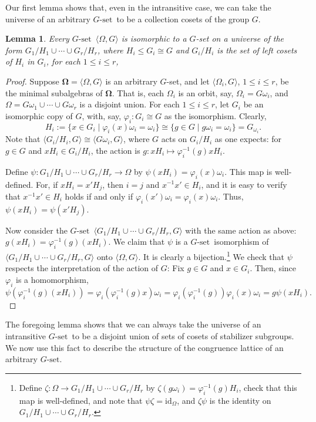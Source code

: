 \documentclass[cm,dissertation]{uhthesis}
\theoremstyle{plain}
\newtheorem{lemma}[theorem]{Lemma}
\theoremstyle{definition}
\newcounter{claim}
\theoremstyle{remark}
\numberwithin{theorem}{section}
\numberwithin{claim}{chapter}
\numberwithin{equation}{section}
\numberwithin{conjecture}{chapter}
\newcommand{\<}{\ensuremath{\langle}}
\renewcommand{\>}{\ensuremath{\rangle}}
\renewcommand{\leq}{\ensuremath{\leqslant}}
\newcommand{\0}{\ensuremath{\mathbf{0}}}
\newcommand{\1}{\ensuremath{\mathbf{1}}}
\newcommand{\2}{\ensuremath{\mathbf{2}}}
\newcommand{\3}{\ensuremath{\mathbf{3}}}
\newcommand{\4}{\ensuremath{\mathbf{4}}}
\newcommand{\5}{\ensuremath{\mathbf{5}}}
\newcommand{\Gset}{\ensuremath{G\text{-set}}}
\newcommand{\alg}[1]{\mathbf{#1}}
\newcommand{\la}{\langle}	     %
\newcommand{\ra}{\rangle}	     %
\newcommand{\id}{\ensuremath{\mathrm{id}}}
\renewcommand{\phi}{\ensuremath{\varphi}}
\begin{document}
Our first lemma shows that, even in the intransitive case, we can take the
universe of an arbitrary \Gset\ to be a collection cosets of the group $G$.
\begin{lemma}
\label{lem:intransitive-gsets}
Every \Gset\ $\la \Omega,G\ra$ is isomorphic to a $G$-set on a universe of
the form $G_1/H_1 \cup \cdots \cup G_r/H_r$, where
$H_i \leq G_i\cong G$ and $G_i/H_i$ is the set of left cosets of $H_i$ in $G_i$,
for each $1\leq i\leq r$, 
\end{lemma}
\begin{proof}
Suppose $\alg \Omega = \la \Omega, G\ra$ is an arbitrary $G$-set, and let $\<\Omega_i, G\>$, 
$1 \leq i \leq r$,
be the minimal subalgebras of $\alg \Omega$.  That is, each $\Omega_i$ is an
orbit, say, $\Omega_i = G\omega_i$,  
and $\Omega = G\omega_1 \cup \cdots \cup G\omega_r$ is a disjoint union.
For each $1\leq i \leq r$, let $G_i$ be an isomorphic copy of $G$, with, say,
$\phi_i: G_i\cong G$ as the isomorphism. Clearly,
\[
H_i := \{x \in G_i \mid  \phi_i(x)\omega_i = \omega_i\} \cong \{g\in G \mid
g \omega_i = \omega_i\} = G_{\omega_i}.
\]
Note that $\<G_i/H_i, G\> \cong \<G \omega_i, G\>$, where $G$ acts on $G_i/H_i$ as one
expects: for $g\in G$ and $xH_i\in G_i/H_i$, the action is
$g: xH_i \mapsto \phi_i^{-1}(g)x H_i$. 

Define 
$\psi: G_1/H_1 \cup \cdots \cup G_r/H_r \rightarrow \Omega$
by $\psi(xH_i)  = \phi_i(x)\omega_i$.  This map is well-defined.  For, if 
$xH_i = x'H_j$, then $i=j$ and $x^{-1}x'\in H_i$, and 
it is easy to verify that $x^{-1}x'\in H_i$ holds if and only if $\phi_i(x')\omega_i = \phi_i(x) \omega_i$.
Thus, $\psi(xH_i) = \psi(x'H_j)$.

Now consider the \Gset\ 
$\<G_1/H_1 \cup \cdots \cup G_r/H_r, G\>$ with the same action as above:
$g(xH_i) =\phi_i^{-1}(g)(x H_i)$.   We claim that $\psi$ is a \Gset\ isomorphism of
$\<G_1/H_1 \cup \cdots \cup G_r/H_r, G\>$ onto
$\<\Omega, G\>$.  It is clearly a bijection.\footnote{Define
$\zeta: \Omega \rightarrow 
G_1/H_1 \cup \cdots \cup G_r/H_r$ by 
$\zeta(g\omega_i) = \phi_i^{-1}(g)H_i$, 
check that this map is well-defined, and
note that $\psi \zeta  = \id_\Omega$, and 
$\zeta \psi$ is the identity on $G_1/H_1 \cup \cdots \cup G_r/H_r$.}
We check that $\psi$ respects the
interpretation of the action of $G$:  Fix $g \in G$ and
$x\in G_i$.  Then, since $\phi_i$ is a homomorphism,
\[
\psi (\phi_i^{-1}(g)(x H_i)) = 
\phi_i (\phi_i^{-1}(g)x) \omega_i
= \phi_i (\phi_i^{-1}(g)) \phi_i (x) \omega_i 
= g \psi (x H_i).
\]
\end{proof}
The foregoing lemma shows that we can always take the universe of an
intransitive \Gset\ to be a disjoint union of sets of cosets of stabilizer
subgroups.  We now use this fact to describe the structure of the congruence
lattice of an arbitrary  \Gset.
\end{document}
